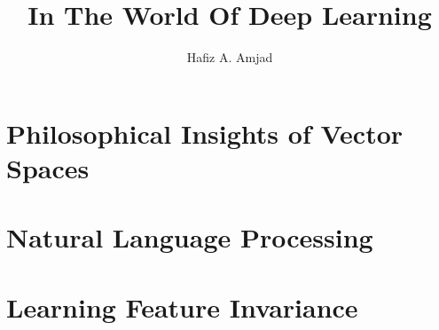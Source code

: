 \documentclass[grad]{ontariotechu-thesis}
\author{Hafiz A. Amjad}
\title{In The World Of Deep Learning}
\begin{document}
\begin{preliminary}

\maketitle








\tableofcontents


\listoftables


\listoffigures


\end{preliminary}

\chapter{Philosophical Insights of Vector Spaces}


\chapter{Natural Language Processing}


\chapter{Learning Feature Invariance}

\end{document}
